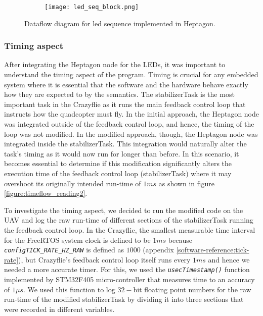 \documentclass[10pt, a4paper]{article}
\newcommand{\textFunc}[1]{\texttt{\textit{#1}}}
\begin{document}
    \begin{figure}[hbt!]
        \centering
        \begin{subfigure}[b]{0.99\textwidth}
            \centering
            \texttt{[image: led\_seq\_block.png]}
        \end{subfigure}
        \caption{Dataflow diagram for led sequence implemented in Heptagon.}
        \label{figure:led_seq}
    \end{figure}

    \subsubsection{Timing aspect}
    After integrating the Heptagon node for the LEDs, it was important to understand the timing aspect of the program. Timing is crucial for any embedded system where it is essential that the software and the hardware behave exactly how they are expected to by the semantics. The stabilizerTask is the most important task in the Crazyflie as it runs the main feedback control loop that instructs how the quadcopter must fly. In the initial approach, the Heptagon node was integrated outside of the feedback control loop, and hence, the timing of the loop was not modified. In the modified approach, though, the Heptagon node was integrated inside the stabilizerTask. This integration would naturally alter the task's timing as it would now run for longer than before. In this scenario, it becomes essential to determine if this modification significantly alters the execution time of the feedback control loop (stabilizerTask) where it may overshoot its originally intended run-time of $1ms$ as shown in figure \ref{figure:timeflow_reading2}.

    To investigate the timing aspect, we decided to run the modified code on the UAV and log the raw run-time of different sections of the stabilizerTask running the feedback control loop. In the Crazyflie, the smallest measurable time interval for the FreeRTOS system clock is defined to be $1ms$ because \textFunc{configTICK\_RATE\_HZ\_RAW} is defined as $1000$ (appendix \ref{software-reference:tick-rate}), but Crazyflie's feedback control loop itself runs every $1ms$ and hence we needed a more accurate timer. For this, we used the \textFunc{usecTimestamp()} function implemented by STM32F405 micro-controller that measures time to an accuracy of $1\mu s$. We used this function to log $32-$bit floating point numbers for the raw run-time of the modified stabilizerTask by dividing it into three sections that were recorded in different variables.
\end{document}
